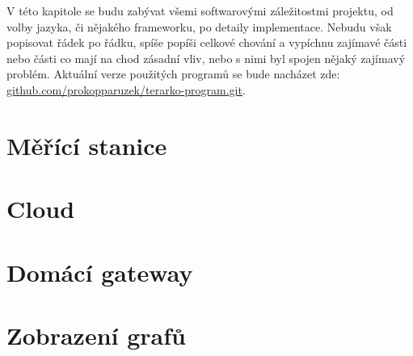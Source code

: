 V této kapitole se budu zabývat všemi softwarovými záležitostmi projektu, od volby jazyka, či nějakého frameworku, po 
detaily implementace. Nebudu však popisovat řádek po řádku, spíše popíši celkové chování a vypíchnu zajímavé části nebo 
části co mají na chod zásadní vliv, nebo s nimi byl spojen nějaký zajímavý problém. Aktuální verze použitých programů se 
bude nacházet zde: 
\href{https://github.com/prokopparuzek/terarko-program.git}{github.com/prokopparuzek/terarko-program.git}.
\section{Měřící stanice}

\section{Cloud}

\section{Domácí gateway}

\section{Zobrazení grafů}
